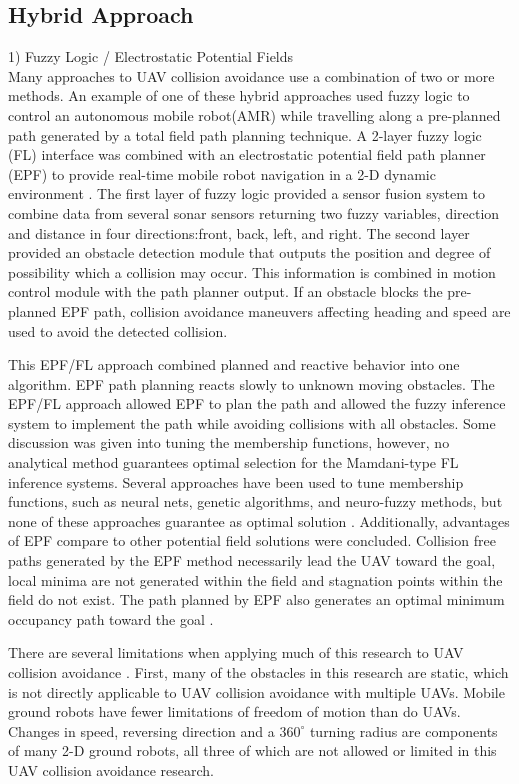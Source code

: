 \documentclass[10pt, conference, compsocconf]{IEEEtran}
\begin{document}
\subsection{Hybrid Approach}
1) Fuzzy Logic / Electrostatic Potential Fields \\
Many approaches to UAV collision avoidance use a combination of two or more methods. An example of one of these hybrid approaches used fuzzy logic to control an autonomous mobile robot(AMR) while travelling along a pre-planned path generated by a total field path planning technique. A 2-layer fuzzy logic (FL) interface was combined with an electrostatic potential field path planner (EPF) to provide real-time mobile robot navigation in a 2-D dynamic environment \cite{tsourveloudis2001autonomous}. The first layer of fuzzy logic provided a sensor fusion system to combine data from several sonar sensors returning two fuzzy variables, direction and distance in four directions:front, back, left, and right. The second layer provided an obstacle detection module that outputs the position and degree of possibility which a collision may occur. This information is combined in motion control module with the path planner output.  If an obstacle blocks the pre-planned EPF path, collision avoidance maneuvers affecting heading and speed are used to avoid the detected collision.

This EPF/FL approach combined planned and reactive behavior into one algorithm.  EPF path planning reacts slowly to unknown moving obstacles. The EPF/FL approach allowed EPF to plan the path and allowed the fuzzy inference system to implement the path while avoiding collisions with all obstacles. Some discussion was given into tuning the membership functions, however, no analytical method guarantees optimal selection for the Mamdani-type FL inference systems. Several approaches have been used to tune membership functions, such as neural nets, genetic algorithms, and neuro-fuzzy methods, but none of these approaches guarantee as optimal solution \cite{tsourveloudis2001autonomous}.  Additionally, advantages of EPF compare to other potential field solutions were concluded. Collision free paths generated by the EPF method necessarily lead the UAV toward the goal, local minima are not generated within the field and stagnation points within the field do not exist. The path planned by EPF also generates an optimal minimum occupancy path toward the goal \cite{tsourveloudis2001autonomous}.

There are several limitations when applying much of this research to UAV collision avoidance . First, many of the obstacles in this research are static, which is not directly applicable to UAV collision avoidance with multiple UAVs. Mobile ground robots have fewer limitations of freedom of motion than do UAVs. Changes in speed, reversing direction and a $360^\circ$ turning radius are components of many 2-D ground robots, all three of which are not allowed or limited in this UAV collision avoidance research. 
\end{document}
